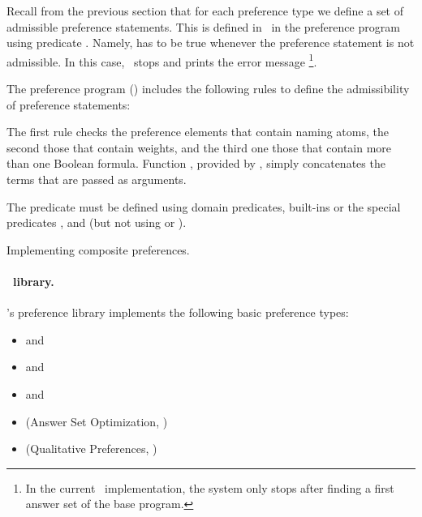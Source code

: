 Recall from the previous section that for each preference type 
we define a set of admissible preference statements.
This is defined in \asprin\ in the preference program using predicate .
Namely,  has to be true whenever the preference statement is not admissible.
In this case, \asprin\ stops and prints the error message \footnote{
In the current \asprin\ implementation, 
the system only stops after finding a first answer set of the base program.}.
\begin{example}
The preference program ()
includes the following rules to define the admissibility of  preference statements:

The first rule checks the preference elements that contain naming atoms, 
the second those that contain weights, 
and the third one those that contain more than one Boolean formula.
Function , provided by \asprin, simply concatenates the terms that are passed as arguments.
\end{example}

\begin{note}
The predicate  must be defined using domain predicates, built-ins or the special 
predicates ,  and  
(but not using  or ).
\end{note}

Implementing composite preferences.

\paragraph{\asprin\ library.}
\asprin's preference library implements the following basic preference types:
\begin{itemize}
	\item  {} and    
	\item  {} and    
	\item  {} and    
	\item  {}   (Answer Set Optimization, \cite{brnitr03a})   
	\item  {} (Qualitative Preferences, \cite{rogima10a})  
\end{itemize}

